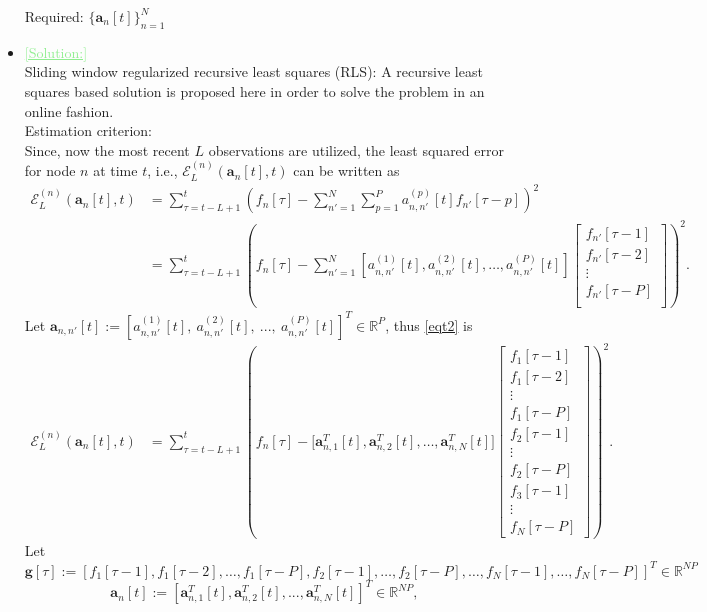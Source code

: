 \documentclass[11pt,final,onecolumn]{IEEEtran}
\newcommand{\cmt}[1]{\noindent\textcolor{lightgreen}{\underline{[#1]}}} %
\newcommand{\cmt}[1]{} %
\begin{document}
\begin{itemize}
Required: $\{ \bm a_n[t]\}_{n=1}^N$   
\item \cmt{Solution:}\\
Sliding window regularized recursive least squares (RLS):
A recursive least squares  based solution is proposed here in order to solve the problem in an online fashion.\\ 
Estimation criterion:\\
Since, now the most recent $L$ observations are utilized, the least squared error for node $n$ at time $t$, i.e., $\mathcal{E}_L^{(n)}(\bm a_n[t],t)$ can be written as
\begin{align}
\mathcal{E}_L^{(n)}(\bm a_n[t],t)&=\sum_{\tau=t-L+1}^{t}\left ( f_n[\tau]-\sum_{n'=1}^{N}\sum_{p=1}^{P} a_{n,n'}^{(p)}[t] f_{n'}[\tau-p]\right )^2\\
&=\sum_{\tau=t-L+1}^{t}\left ( f_n[\tau]-\sum_{n'=1}^{N} \left [ a_{n,n'}^{(1)}[t], a_{n,n'}^{(2)}[t], \ldots, a_{n,n'}^{(P)}[t]\right]
\begin{bmatrix}
f_{n'}[\tau -1]\\
f_{n'}[\tau -2]\\
\vdots\\
f_{n'}[\tau -P]\\
\end{bmatrix}
 \right )^2. \label{eqt2}
\end{align} 
Let $\bm a_{n,n'}[t]:=[a_{n,n'}^{(1)}[t], ~ a_{n,n'}^{(2)}[t],~ ..., ~a_{n,n'}^{(P)}[t]]^T\in \mathbb R^ {P}$, thus \eqref{eqt2} is\\
\begin{align}
\mathcal{E}_L^{(n)}(\bm a_n[t],t)&=\sum_{\tau=t-L+1}^{t}\left ( f_n[\tau]-\big [ \bm a_{n,1}^T[t], \bm a_{n,2}^T[t], \ldots, \bm a_{n,N}^T[t] \big]
\begin{bmatrix}
f_{1}[\tau -1]\\
f_{1}[\tau -2]\\
\vdots\\
f_{1}[\tau -P]\\
f_{2}[\tau -1]\\
\vdots\\
f_{2}[\tau -P]\\
f_{3}[\tau -1]\\
\vdots\\
f_{N}[\tau -P]
\end{bmatrix}
\right )^2. \label{eqc}
\end{align}
Let
\begin{equation}\label{key20}
 \bm g[\tau]:=\left [f_1[\tau-1], f_1[\tau-2],\ldots ,f_1[\tau-P], f_2[\tau-1], \ldots, f_2[\tau-P], \ldots , f_N[\tau-1], \ldots , f_N[\tau-P]\right ]^T \in \mathbb R^ {NP}
\end{equation}
\begin{equation}\label{key21}
\bm a_{n}[t]:=[\bm a_{n,1}^T[t], \bm a_{n,2}^T[t],  ..., \bm a_{n,N}^T[t]]^T  \in \mathbb R^ {NP},
\end{equation}


\end{itemize}
\end{document}
